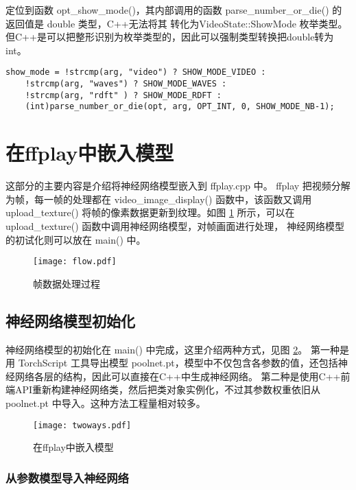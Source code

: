 定位到函数 opt\_show\_mode()，其内部调用的函数 parse\_number\_or\_die() 的返回值是 double 类型，C++无法将其
转化为VideoState::ShowMode 枚举类型。但C++是可以把整形识别为枚举类型的，因此可以强制类型转换把double转为int。

\begin{lstlisting}
show_mode = !strcmp(arg, "video") ? SHOW_MODE_VIDEO :
    !strcmp(arg, "waves") ? SHOW_MODE_WAVES :
    !strcmp(arg, "rdft" ) ? SHOW_MODE_RDFT :
    (int)parse_number_or_die(opt, arg, OPT_INT, 0, SHOW_MODE_NB-1);
\end{lstlisting}

\section{在ffplay中嵌入模型}

这部分的主要内容是介绍将神经网络模型嵌入到 ffplay.cpp 中。
ffplay 把视频分解为帧，每一帧的处理都在 video\_image\_display() 函数中，该函数又调用
upload\_texture() 将帧的像素数据更新到纹理。如图 \ref{fig:flow} 所示，可以在 upload\_texture() 函数中调用神经网络模型，对帧画面进行处理，
神经网络模型的初试化则可以放在 main() 中。

\begin{figure}[h]
\centering
\texttt{[image: flow.pdf]}
\caption{帧数据处理过程}
\label{fig:flow}
\end{figure}

\subsection{神经网络模型初始化}

神经网络模型的初始化在 main() 中完成，这里介绍两种方式，见图 \ref{fig:twoways}。
第一种是用 TorchScript 工具导出模型 poolnet.pt，模型中不仅包含各参数的值，还包括神经网络各层的结构，因此可以直接在C++中生成神经网络。
第二种是使用C++前端API重新构建神经网络类，然后把类对象实例化，不过其参数权重依旧从 poolnet.pt 中导入。这种方法工程量相对较多。

\begin{figure}[h]
\centering
\texttt{[image: twoways.pdf]}
\caption{在ffplay中嵌入模型}
\label{fig:twoways}
\end{figure}

\subsubsection{从参数模型导入神经网络}


